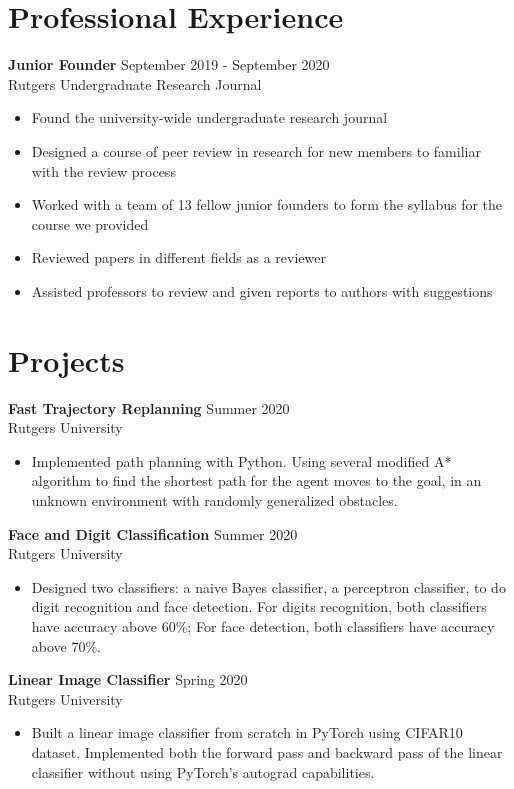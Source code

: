 \documentclass{article}
\begin{document}
\section{Professional Experience}
\textbf{Junior Founder}
\hfill{September 2019 - September 2020}\\
Rutgers Undergraduate Research Journal
\begin{itemize}
  \itemsep0em
  \item Found the university-wide undergraduate research journal
  \item Designed a course of peer review in research for new members to familiar with the
review process
  \item  Worked with a team of 13 fellow junior founders to form the syllabus for the course we
provided
  \item Reviewed papers in different fields as a reviewer
  \item Assisted professors to review and given reports to authors with suggestions
\end{itemize}


\section{Projects}
\textbf{Fast Trajectory Replanning}
\hfill{Summer 2020}\\
Rutgers University
\begin{itemize}
  \itemsep0em
  \item Implemented path planning with Python. Using several modified A* algorithm to find the shortest path for the agent moves to the goal, in an unknown environment with randomly generalized obstacles. 
\end{itemize}

\noindent \textbf{Face and Digit Classification}
\hfill{Summer 2020}\\
Rutgers University
\begin{itemize}
  \itemsep0em
  \item Designed two classifiers: a naive Bayes classifier, a perceptron classifier, to do digit recognition and face detection. For digits recognition, both classifiers have accuracy above 60\%; For face detection, both classifiers have accuracy above 70\%.
\end{itemize}

\noindent \textbf{Linear Image Classifier}
\hfill{Spring 2020}\\
Rutgers University
\begin{itemize}
  \itemsep0em
  \item Built a linear image classifier from scratch in PyTorch using CIFAR10 dataset. Implemented both the forward pass and backward pass of the linear classifier without using PyTorch's autograd capabilities.
\end{itemize}
\end{document}
